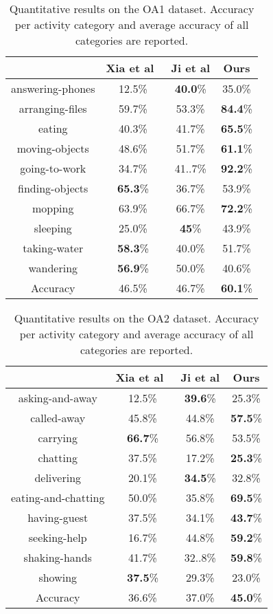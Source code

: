 \documentclass{sig-alternate}
\begin{document}
\begin{table}[!hbp]
\center
\begin{tabular}{|c|c|c|c|}
\hline
\hline
& Xia et al~\cite{DSTIP} & Ji et al\cite{3DCNNPAMI} & Ours \\
\hline
\hline
answering-phones & 12.5\% & \textbf{40.0}\% & 35.0\% \\
arranging-files & 59.7\% & 53.3\% & \textbf{84.4}\% \\
eating & 40.3\% & 41.7\% & \textbf{65.5}\%\\
moving-objects & 48.6\% & 51.7\% & \textbf{61.1}\% \\
going-to-work & 34.7\% & 41..7\% & \textbf{92.2}\% \\
finding-objects & \textbf{65.3}\% & 36.7\% & 53.9\% \\
mopping & 63.9\% & 66.7\% & \textbf{72.2}\% \\
sleeping & 25.0\% & \textbf{45}\% & 43.9\% \\
taking-water & \textbf{58.3}\% & 40.0\% & 51.7\% \\
wandering & \textbf{56.9}\% & 50.0\% & 40.6\% \\
\hline
\hline
Accuracy & 46.5\% & 46.7\% & \textbf{60.1}\% \\
\hline
\end{tabular}
\caption{ Quantitative results on the OA1 dataset.  Accuracy per activity category and average accuracy of all categories are reported.}
\label{tab:hao1}
\end{table}

\begin{table}[!hbp]
\center
\begin{tabular}{|c|c|c|c|}
\hline
\hline
& Xia et al~\cite{DSTIP} &Ji et al\cite{3DCNNPAMI} & Ours \\
\hline
asking-and-away & 12.5\% & \textbf{39.6}\% & 25.3\% \\
called-away & 45.8\% & 44.8\% & \textbf{57.5}\% \\
carrying & \textbf{66.7}\% & 56.8\% & 53.5\% \\
chatting & 37.5\% & 17.2\% & \textbf{25.3}\% \\
delivering & 20.1\% & \textbf{34.5}\% & 32.8\% \\
eating-and-chatting & 50.0\% & 35.8\% & \textbf{69.5}\% \\
having-guest & 37.5\% & 34.1\% & \textbf{43.7}\% \\
seeking-help & 16.7\% & 44.8\% & \textbf{59.2}\% \\
shaking-hands & 41.7\% & 32..8\% & \textbf{59.8}\% \\
showing & \textbf{37.5}\% & 29.3\% & 23.0\% \\
\hline
\hline
Accuracy & 36.6\% & 37.0\% & \textbf{45.0}\% \\
\hline
\end{tabular}
\caption{ Quantitative results on the OA2 dataset. Accuracy per activity category and average accuracy of all categories are reported.}
\label{tab:hao2}
\end{table}
\end{document}
